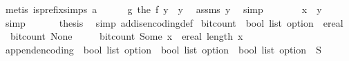 \begin{isabellebody}
\ {\isacharparenleft}{\kern0pt}metis\ is{\isacharunderscore}{\kern0pt}prefix{\isachardot}{\kern0pt}simps{\isacharparenleft}{\kern0pt}{}{\isacharparenright}{\kern0pt}\ a{\isacharparenright}{\kern0pt}\isanewline
\ \ \ \ \isamarkupfalse%
\ {\isachardoublequoteopen}g\ {\isacharparenleft}{\kern0pt}the\ {\isacharparenleft}{\kern0pt}f\ y{\isacharparenright}{\kern0pt}{\isacharparenright}{\kern0pt}\ {\isacharequal}{\kern0pt}\ {\isacharparenleft}{\kern0pt}y{\isacharcomma}{\kern0pt}{\isacharbrackleft}{\kern0pt}{\isacharbrackright}{\kern0pt}{\isacharparenright}{\kern0pt}{\isachardoublequoteclose}\ \isamarkupfalse%
\ assms{\isacharbrackleft}{\kern0pt}\ y{\isacharequal}{\kern0pt}{\isachardoublequoteopen}{\isacharbrackleft}{\kern0pt}{\isacharbrackright}{\kern0pt}{\isachardoublequoteclose}{\isacharbrackright}{\kern0pt}\ \isamarkupfalse%
\ simp\isanewline
\ \ \ \ \isamarkupfalse%
\ \isamarkupfalse%
\ {\isachardoublequoteopen}x\ {\isacharequal}{\kern0pt}\ y{\isachardoublequoteclose}\ \isamarkupfalse%
\ simp\isanewline
\ \ \isamarkupfalse%
\isanewline
\ \ \isamarkupfalse%
\ {\isacharquery}{\kern0pt}thesis\ \isamarkupfalse%
\ {\isacharparenleft}{\kern0pt}simp\ add{\isacharcolon}{\kern0pt}is{\isacharunderscore}{\kern0pt}encoding{\isacharunderscore}{\kern0pt}def{\isacharparenright}{\kern0pt}\isanewline
{}\isamarkupfalse%
%
\endisatagproof
{\isafoldproof}%
%
\isadelimproof
\isanewline
%
\endisadelimproof
\isanewline
{}\isamarkupfalse%
\ bit{\isacharunderscore}{\kern0pt}count\ {\isacharcolon}{\kern0pt}{\isacharcolon}{\kern0pt}\ {\isachardoublequoteopen}bool\ list\ option\ {\isasymRightarrow}\ ereal{\isachardoublequoteclose}\ \isanewline
\ \ {\isachardoublequoteopen}bit{\isacharunderscore}{\kern0pt}count\ None\ {\isacharequal}{\kern0pt}\ {\isasyminfinity}{\isachardoublequoteclose}\ {\isacharbar}{\kern0pt}\isanewline
\ \ {\isachardoublequoteopen}bit{\isacharunderscore}{\kern0pt}count\ {\isacharparenleft}{\kern0pt}Some\ x{\isacharparenright}{\kern0pt}\ {\isacharequal}{\kern0pt}\ ereal\ {\isacharparenleft}{\kern0pt}length\ x{\isacharparenright}{\kern0pt}{\isachardoublequoteclose}\isanewline
\isanewline
{}\isamarkupfalse%
\ append{\isacharunderscore}{\kern0pt}encoding\ {\isacharcolon}{\kern0pt}{\isacharcolon}{\kern0pt}\ {\isachardoublequoteopen}bool\ list\ option\ {\isasymRightarrow}\ bool\ list\ option\ {\isasymRightarrow}\ bool\ list\ option{\isachardoublequoteclose}\ {\isacharparenleft}{\kern0pt}\ {\isachardoublequoteopen}{\isacharat}{\kern0pt}\isactrlsub S{\isachardoublequoteclose}\ {}{}{\isacharparenright}{\kern0pt}\isanewline

\end{isabellebody}

